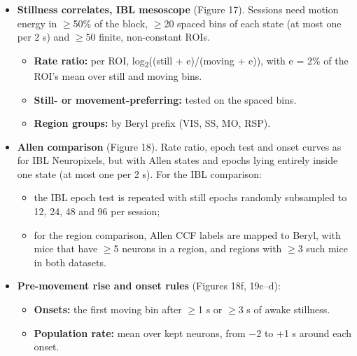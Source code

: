 \documentclass[10pt,a4paper]{article}
\begin{document}
\begin{itemize}
\begin{itemize}
\item \textbf{Population:} per region and probe with $\geq$8 neurons, in 100 ms bins whose two 50 ms bins share the state, with equal random numbers per state ($\geq$200). Measures: mean pairwise correlation, participation ratio / N, and the fraction of bins with summed count $>$3 SD above the within-state mean. Rate matching thins the higher-rate state binomially.
\item \textbf{Pupil:} in fully awake-still 1 s bins ($\geq$60), the partial correlation of spike count with pupil, with time (quadratic) and motion energy regressed out of both.
\end{itemize}
\item \textbf{Stillness correlates, IBL mesoscope} (Figure 17). Sessions need motion energy in $\geq$50\% of the block, $\geq$20 spaced bins of each state (at most one per 2 s) and $\geq$50 finite, non-constant ROIs. 
\begin{itemize}
\item \textbf{Rate ratio:} per ROI, log\textsubscript{2}((still + e)/(moving + e)), with e = 2\% of the ROI's mean over still and moving bins.
\item \textbf{Still- or movement-preferring:} tested on the spaced bins.
\item \textbf{Region groups:} by Beryl prefix (VIS, SS, MO, RSP).
\end{itemize}
\item \textbf{Allen comparison} (Figure 18). Rate ratio, epoch test and onset curves as for IBL Neuropixels, but with Allen states and epochs lying entirely inside one state (at most one per 2 s). For the IBL comparison: 
\begin{itemize}
\item the IBL epoch test is repeated with still epochs randomly subsampled to 12, 24, 48 and 96 per session;
\item for the region comparison, Allen CCF labels are mapped to Beryl, with mice that have $\geq$5 neurons in a region, and regions with $\geq$3 such mice in both datasets.
\end{itemize}
\item \textbf{Pre-movement rise and onset rules} (Figures 18f, 19c--d): 
\begin{itemize}
\item \textbf{Onsets:} the first moving bin after $\geq$1 s or $\geq$3 s of awake stillness.
\item \textbf{Population rate:} mean over kept neurons, from $-$2 to +1 s around each onset.

\end{itemize}
\end{itemize}
\end{document}
